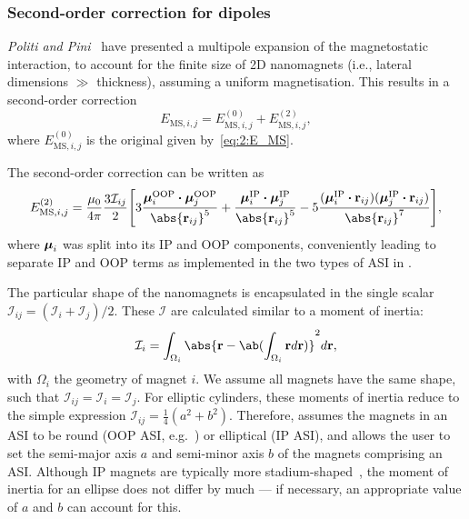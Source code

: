 \subsubsection{Second-order correction for dipoles}
\textit{Politi and Pini}~\cite{Dipolar2Dparticles} have presented a multipole expansion of the magnetostatic interaction, to account for the finite size of 2D nanomagnets (i.e., lateral dimensions $\gg$ thickness), assuming a uniform magnetisation.
This results in a second-order correction
\begin{equation}
	E_{\mathrm{MS},i,j} = E_{\mathrm{MS},i,j}^\mathrm{(0)} + E_{\mathrm{MS},i,j}^\mathrm{(2)} \mathrm{,}
\end{equation}
where $E_{\mathrm{MS},i,j}^\mathrm{(0)}$ is the original   given by~\cref{eq:2:E_MS}. \par
The second-order correction can be written as
\begin{equation}
	\label{eq:2:E_MS_order2}
	E_{\mathrm{MS},i,j}^\mathrm{(2)} = \frac{\mu_0}{4\pi} \frac{3\mathcal{I}_{ij}}{2} \Bigg[3\frac{\vc{\mu}_i^\mathrm{OOP} \bcdot \vc{\mu}_j^\mathrm{OOP}}{\abs{\vc{r}_{ij}}^5} + \frac{\vc{\mu}_i^\mathrm{IP} \bcdot \vc{\mu}_j^\mathrm{IP}}{\abs{\vc{r}_{ij}}^5} -5\frac{(\vc{\mu}_i^\mathrm{IP} \bcdot \vc{r}_{ij}) (\vc{\mu}_j^\mathrm{IP} \bcdot \vc{r}_{ij})}{\abs{\vc{r}_{ij}}^7} \Bigg] \mathrm{,}
\end{equation}
where $\boldsymbol{\mathbf{\mu}}_i$ was split into its IP and OOP components, conveniently leading to separate IP and OOP terms as implemented in the two types of ASI in \hotspice. \par
The particular shape of the nanomagnets is encapsulated in the single scalar $\mathcal{I}_{ij} = (\mathcal{I}_i + \mathcal{I}_j)/2$.
These $\mathcal{I}$ are calculated similar to a moment of inertia:
\begin{equation}
	\mathcal{I}_i = \int_{\Omega_i} \abs{\vc{r} - \ab(\int_{\Omega_i} \vc{r} d\vc{r})}^2 d\vc{r} \mathrm{,}
\end{equation}
with $\Omega_i$ the geometry of magnet $i$.
We assume all magnets have the same shape, such that $\mathcal{I}_{ij} = \mathcal{I}_i = \mathcal{I}_j$.
For elliptic cylinders, these moments of inertia reduce to the simple expression $\mathcal{I}_{ij} = \frac{1}{4}(a^2 + b^2)$.
Therefore, \hotspice assumes the magnets in an ASI to be round (OOP ASI, e.g.~\cite{PerpendicularMagnetizationASI}) or elliptical (IP ASI), and allows the user to set the semi-major axis $a$ and semi-minor axis $b$ of the magnets comprising an ASI.
Although IP magnets are typically more stadium-shaped~\cite{EmergentChiralityRatchet,clocking-protocol}, the moment of inertia for an ellipse does not differ by much --- if necessary, an appropriate value of $a$ and $b$ can account for this.

